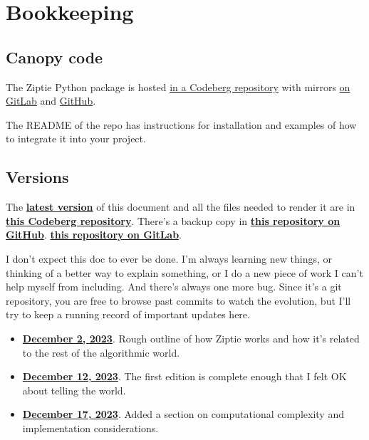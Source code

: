 \section{Bookkeeping}
\label{sec:bookkeeping}

\subsection{Canopy code}
\label{subsec:code}

The Ziptie Python package is hosted
\href{
https://codeberg.org/brohrer/ziptie
}{in a Codeberg repository}
with mirrors
\href{
https://gitlab.com/brohrer/ziptie
}{on GitLab} and
\href{
https://github.com/brohrer/ziptie
}{GitHub}.

The README of the repo has instructions for installation and
examples of how to integrate it into your project.

\subsection{Versions}
\label{subsec:versions}

The \textbf{\href{
https://codeberg.org/brohrer/ziptie-paper/src/branch/main/ziptie.pdf}
{latest version}}
of this document and all the files needed to
render it are in \textbf{\href{
https://codeberg.org/brohrer/ziptie-paper}
{this Codeberg repository}}. There's a backup copy in \textbf{
\href{https://github.com/brohrer/ziptie-paper}
{this repository on GitHub}}.
 \textbf{
\href{https://gitlab.com/brohrer/ziptie-paper}
{this repository on GitLab}}.

I don't expect this doc to ever be done. I'm always learning new things,
or thinking of a better way to explain something, or I do a new
piece of work I can't help myself from including. And there's always
one more bug.
Since it's a git repository, you are free to browse past commits to watch
the evolution, but I'll try to keep a running record of important updates
here.

\begin{itemize}
\item{\textbf{\href{
https://codeberg.org/brohrer/ziptie-paper/src/commit/758b34e0749b75f35c98818d11d41553a8828b48/ziptie.pdf}
{December 2, 2023}}. Rough outline of how Ziptie works
and how it's related to the rest of the algorithmic world.}
\item{\textbf{\href{
https://codeberg.org/brohrer/ziptie-paper/src/tag/2023-12-12/ziptie.pdf}
{December 12, 2023}}. The first edition is complete enough that
I felt OK about telling the world.}
\item{\textbf{\href{
https://codeberg.org/brohrer/ziptie-paper/src/tag/2023-12-17/ziptie.pdf}
{December 17, 2023}}. Added a section on
computational complexity and implementation considerations.}
\end{itemize}

